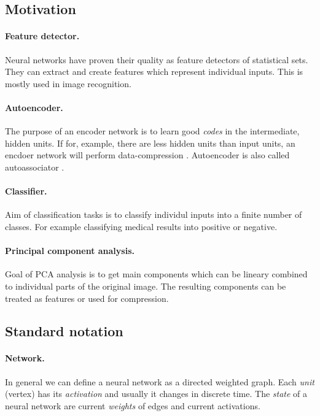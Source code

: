 \subsection{Motivation}

\paragraph{Feature detector.}
Neural networks have proven their quality as feature detectors of statistical sets. They can extract and create features which represent individual inputs. This is mostly used in image recognition. 

\paragraph{Autoencoder.}
The purpose of an encoder network is to learn good \textit{codes} in the intermediate, hidden units. If for, example, there are less hidden units than input units, an encdoer network will perform data-compression  \cite{hinton1988learning}. Autoencoder is also called autoassociator \cite{bengio2009learning}.

\paragraph{Classifier.}
Aim of classification tasks is to classify individul inputs into a finite number of classes. For example classifying medical results into positive or negative. 

\paragraph{Principal component analysis.}
Goal of PCA analysis is to get main components which can be lineary combined to individual parts of the original image. The resulting components can be treated as features or used for compression. 

\subsection{Standard notation}

\paragraph{Network.}
In general we can define a neural network as a directed weighted graph. Each \emph{unit} (vertex) has its \emph{activation} and usually it changes in discrete time. The \emph{state} of a neural network are current \emph{weights} of edges and current activations. 

